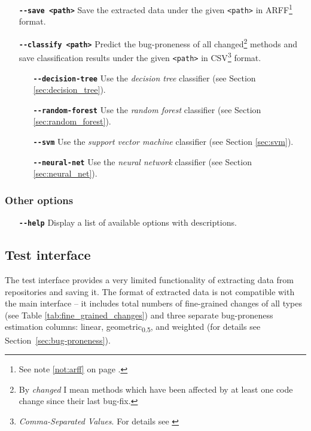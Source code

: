 \documentclass{pracamgr}
\newcommand{\clopt}[1]{\texttt{\textbf{-{}-#1}}}
\begin{document}
\begin{itemize}[leftmargin=1.5in]

\item[\clopt{save <path>}] Save the extracted data under the given \texttt{<path>} in ARFF\footnote{See note \ref{not:arff} on page \pageref{not:arff}.} format.

\item[\clopt{classify <path>}] Predict the bug-proneness of all changed\footnote{By \emph{changed} I mean methods which have been affected by at least one code change since their last bug-fix.} methods and save classification results under the given \texttt{<path>} in CSV\footnote{\emph{Comma-Separated Values}. For details see \cite{csv}} format.

	\begin{itemize}[leftmargin=0.5in]
	\item[\clopt{decision-tree}] Use the \emph{decision tree} classifier (see Section \ref{sec:decision_tree}).
	\item[\clopt{random-forest}] Use the \emph{random forest} classifier (see Section \ref{sec:random_forest}).
	\item[\clopt{svm}] Use the \emph{support vector machine} classifier (see Section \ref{sec:svm}).
	\item[\clopt{neural-net}] Use the \emph{neural network} classifier (see Section \ref{sec:neural_net}).
	\end{itemize}

\end{itemize}

\subsubsection*{Other options}

\begin{itemize}[leftmargin=1.5in]

\item[\clopt{help}] Display a list of available options with descriptions.

\end{itemize}

\subsection{Test interface}
\label{sec:test_interface}

The test interface provides a very limited functionality of extracting data from repositories and saving it. The format of extracted data is not compatible with the main interface -- it includes total numbers of fine-grained changes of all types (see Table \ref{tab:fine_grained_changes}) and three separate bug-proneness estimation columns: linear, geometric\textsubscript{0.5}, and weighted (for details see Section~\ref{sec:bug-proneness}).
\end{document}
